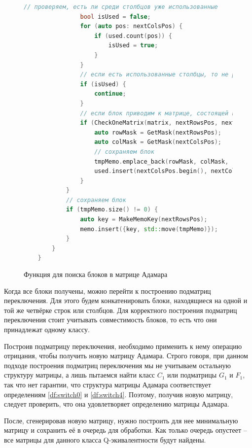 \begin{figure}[H]
\begin{minipage}{\linewidth}
\begin{lstlisting}[language=c++, tabsize=4, showspaces=false, basicstyle=\fontsize{9.5}{11.5}\selectfont, numbers=none]
                // проверяем, есть ли среди столбцов уже использованные
                bool isUsed = false;
                for (auto pos: nextColsPos) {
                    if (used.count(pos)) {
                        isUsed = true;
                    }
                }
                // если есть использованные столбцы, то не рассматриваем такой блок
                if (isUsed) {
                    continue;
                }
                // если блок приводим к матрице, состоящей из единиц
                if (CheckOneMatrix(matrix, nextRowsPos, nextColsPos, rowsToNegateMask, colsToNegateMask)) {
                    auto rowMask = GetMask(nextRowsPos);
                    auto colMask = GetMask(nextColsPos);
                    // сохраняем блок
                    tmpMemo.emplace_back(rowMask, colMask, rowsToNegateMask, colsToNegateMask, nextRowsPos, nextColsPos);
                    used.insert(nextColsPos.begin(), nextColsPos.end());
                }
            }
            // сохраняем блок
            if (tmpMemo.size() != 0) {
                auto key = MakeMemoKey(nextRowsPos);
                memo.insert({key, std::move(tmpMemo)});
            }
        }
    }
    \end{lstlisting}
    \end{minipage}
    \caption{Функция для поиска блоков в матрице Адамара}
    \label{alg:blocks_finder}
\end{figure}

Когда все блоки получены, можно перейти к построению подматриц переключения. Для этого будем конкатенировать блоки, находящиеся на одной и той же четвёрке строк или столбцов. Для корректного построения подматриц переключения стоит учитывать совместимость блоков, то есть что они принадлежат одному классу.

Построив подматрицу переключения, необходимо применить к нему операцию отрицания, чтобы получить новую матрицу Адамара. Строго говоря, при данном подходе построения подматриц переключения мы не учитываем остальную структуру матрицы, а лишь пытаемся найти класс $C_1$ или подматрицы $G_1$ и $F_1$, так что нет гарантии, что структура матрицы Адамара соответствует определениям \ref{df:switch0} и \ref{df:switch4}. Поэтому, получив новую матрицу, следует проверить, что она удовлетворяет определению матрицы Адамара.

После, сгенерировав новую матрицу, нужно построить для нее минимальную матрицу и сохранить её в очередь для обработки. Как только очередь опустеет -- все матрицы для данного класса Q-экивалентности будут найдены.

